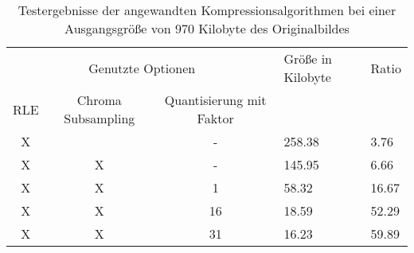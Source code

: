 \begin{table}
\centering
\begin{tabular}{|ccc|l|l|}
	\hline
	\multicolumn{3}{|c|}{Genutzte Optionen}             & Größe in Kilobyte & Ratio \\
	RLE & Chroma Subsampling & Quantisierung mit Faktor &                   &       \\
	\hline
	X   &                    & -                        & 258.38            & 3.76  \\
	X   & X                  & -                        & 145.95            & 6.66  \\
	X   & X                  & 1                        & 58.32             & 16.67 \\
	X   & X                  & 16                       & 18.59             & 52.29 \\
	X   & X                  & 31                       & 16.23             & 59.89 \\
	\hline
\end{tabular}
\caption{Testergebnisse der angewandten Kompressionsalgorithmen bei einer Ausgangsgröße von 970 Kilobyte des Originalbildes}
\label{tab:test}
\end{table}

